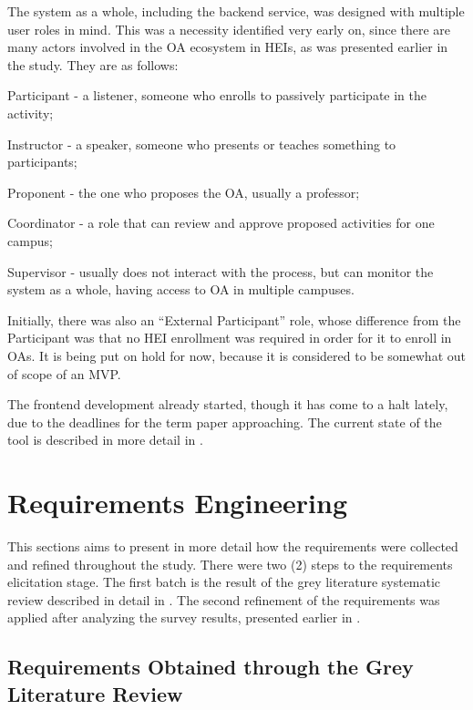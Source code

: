The system as a whole, including the backend service, was designed with multiple user roles in mind. This was a necessity identified very early on, since there are many actors involved in the \ac{OA} ecosystem in \acp{HEI}, as was presented earlier in the study. They are as follows:
\begin{inparaenum}[(1)]
  \item Participant - a listener, someone who enrolls to passively participate in the activity;
  \item Instructor - a speaker, someone who presents or teaches something to participants;
  \item Proponent - the one who proposes the \ac{OA}, usually a professor;
  \item Coordinator - a role that can review and approve proposed activities for one campus;
  \item Supervisor - usually does not interact with the process, but can monitor the system as a whole, having access to \ac{OA} in multiple campuses.
\end{inparaenum}
Initially, there was also an ``External Participant'' role, whose difference from the Participant was that no \ac{HEI} enrollment was required in order for it to enroll in \acp{OA}. It is being put on hold for now, because it is considered to be somewhat out of scope of an \ac{MVP}.

The frontend development already started, though it has come to a halt lately, due to the deadlines for the term paper approaching. The current state of the tool is described in more detail in .

\section{Requirements Engineering}\label{ext:requirement-engineering}

This sections aims to present in more detail how the requirements were collected and refined throughout the study. There were two (2) steps to the requirements elicitation stage. The first batch is the result of the grey literature systematic review described in detail in . The second refinement of the requirements was applied after analyzing the survey results, presented earlier in .

\subsection{Requirements Obtained through the Grey Literature Review}\label{ext:requirements-grey}

